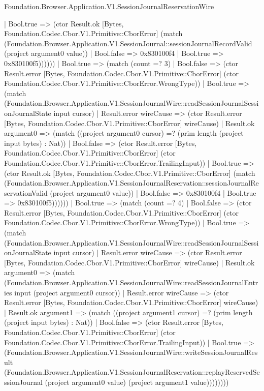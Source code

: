 \begin{lexlean}{Foundation.Browser.Application.V1.SessionJournalReservationWire}
\begin{semanticmodule}
{                    | Bool.true => (ctor Result.ok [Bytes, Foundation.Codec.Cbor.V1.Primitive::CborError] (match (Foundation.Browser.Application.V1.SessionJournal::sessionJournalRecordValid (project argument0 value))
                      | Bool.false => 0x830100f4
                      | Bool.true => 0x830100f5))))))
            | Bool.true => (match (count =? 3)
              | Bool.false => (ctor Result.error [Bytes, Foundation.Codec.Cbor.V1.Primitive::CborError] (ctor Foundation.Codec.Cbor.V1.Primitive::CborError.WrongType))
              | Bool.true => (match (Foundation.Browser.Application.V1.SessionJournalWire::readSessionJournalSessionJournalState input cursor)
                | Result.error wireCause => (ctor Result.error [Bytes, Foundation.Codec.Cbor.V1.Primitive::CborError] wireCause)
                | Result.ok argument0 => (match ((project argument0 cursor) =? (prim length (project input bytes) : Nat))
                  | Bool.false => (ctor Result.error [Bytes, Foundation.Codec.Cbor.V1.Primitive::CborError] (ctor Foundation.Codec.Cbor.V1.Primitive::CborError.TrailingInput))
                  | Bool.true => (ctor Result.ok [Bytes, Foundation.Codec.Cbor.V1.Primitive::CborError] (match (Foundation.Browser.Application.V1.SessionJournalReservation::sessionJournalReservationValid (project argument0 value))
                    | Bool.false => 0x830100f4
                    | Bool.true => 0x830100f5))))))
          | Bool.true => (match (count =? 4)
            | Bool.false => (ctor Result.error [Bytes, Foundation.Codec.Cbor.V1.Primitive::CborError] (ctor Foundation.Codec.Cbor.V1.Primitive::CborError.WrongType))
            | Bool.true => (match (Foundation.Browser.Application.V1.SessionJournalWire::readSessionJournalSessionJournalState input cursor)
              | Result.error wireCause => (ctor Result.error [Bytes, Foundation.Codec.Cbor.V1.Primitive::CborError] wireCause)
              | Result.ok argument0 => (match (Foundation.Browser.Application.V1.SessionJournalWire::readSessionJournalEntries input (project argument0 cursor))
                | Result.error wireCause => (ctor Result.error [Bytes, Foundation.Codec.Cbor.V1.Primitive::CborError] wireCause)
                | Result.ok argument1 => (match ((project argument1 cursor) =? (prim length (project input bytes) : Nat))
                  | Bool.false => (ctor Result.error [Bytes, Foundation.Codec.Cbor.V1.Primitive::CborError] (ctor Foundation.Codec.Cbor.V1.Primitive::CborError.TrailingInput))
                  | Bool.true => (Foundation.Browser.Application.V1.SessionJournalWire::writeSessionJournalResult (Foundation.Browser.Application.V1.SessionJournalReservation::replayReservedSessionJournal (project argument0 value) (project argument1 value))))))))
}
\end{semanticmodule}
\end{lexlean}
